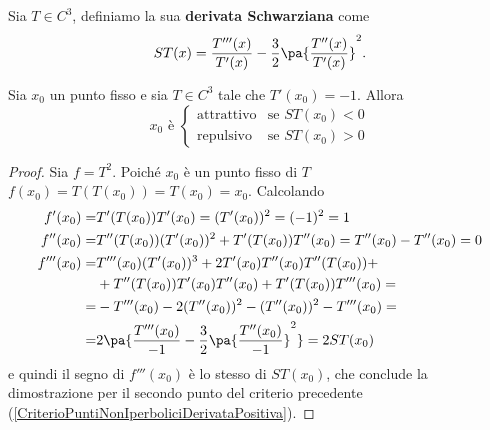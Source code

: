 \begin{definition}
Sia $T\in C^3$, definiamo la sua \textbf{derivata Schwarziana} come
\[ST(x)=\frac{T'''(x)}{T'(x)}-\frac32\pa{\frac{T''(x)}{T'(x)}}^2.\]
\end{definition}
\begin{proposition}\label{CriterioPuntiNonIperboliciDerivataNegativa}
Sia $x_0$ un punto fisso e sia $T\in C^3$ tale che $T'(x_0)=-1$. Allora
\[x_0\text{ \`e }\begin{cases}
\text{attrattivo} &\text{se }ST(x_0)<0\\
\text{repulsivo} &\text{se }ST(x_0)>0
\end{cases}\]
\end{proposition}
\begin{proof}
Sia $f=T^2$. Poich\'e $x_0$ \`e un punto fisso di $T$ $f(x_0)=T(T(x_0))=T(x_0)=x_0$. Calcolando
\begin{align*}
	f'(x_0)=&T'(T(x_0))T'(x_0)=(T'(x_0))^2=(-1)^2=1\\
	f''(x_0)=&T''(T(x_0))(T'(x_0))^2+T'(T(x_0))T''(x_0)=T''(x_0)-T''(x_0)=0\\
	f'''(x_0)=&T'''(x_0)(T'(x_0))^3+2T'(x_0)T''(x_0)T''(T(x_0))+\\
	&+T''(T(x_0))T'(x_0)T''(x_0)+T'(T(x_0))T'''(x_0)=\\
	=&-T'''(x_0)-2(T''(x_0))^2-(T''(x_0))^2-T'''(x_0)=\\
	=&2\pa{\frac{T'''(x_0)}{-1}-\frac32\pa{\frac{T''(x_0)}{-1}}^2}=2ST(x_0)
\end{align*}
e quindi il segno di $f'''(x_0)$ \`e lo stesso di $ST(x_0)$, che conclude la dimostrazione per il secondo punto del criterio precedente (\ref{CriterioPuntiNonIperboliciDerivataPositiva}).
\end{proof}


